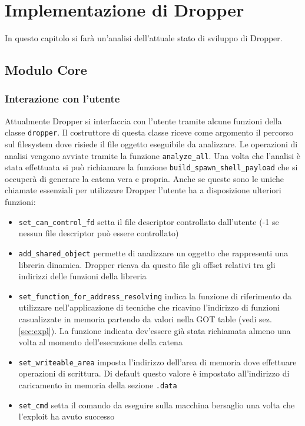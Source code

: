 \chapter{Implementazione di Dropper}
\label{cap:implementazione}

In questo capitolo si farà un'analisi dell'attuale stato di sviluppo
di Dropper.

\section{Modulo Core}

\subsection{Interazione con l'utente}

Attualmente Dropper si interfaccia con l'utente tramite alcune
funzioni della classe \lstinline{dropper}. Il costruttore di questa
classe riceve come argomento il percorso sul filesystem dove risiede
il file oggetto eseguibile da analizzare. Le operazioni di analisi
vengono avviate tramite la funzione \lstinline{analyze_all}. Una volta
che l'analisi è stata effettuata si può richiamare la funzione
\lstinline{build_spawn_shell_payload} che si occuperà di generare la
catena vera e propria. Anche se queste sono le uniche chiamate
essenziali per utilizzare Dropper l'utente ha a disposizione ulteriori
funzioni:
\begin{itemize}

\item \lstinline{set_can_control_fd} setta il file descriptor
  controllato dall'utente (-1 se nessun file descriptor può essere
  controllato)

\item \lstinline{add_shared_object} permette di analizzare un oggetto
  che rappresenti una libreria dinamica. Dropper ricava da questo file
  gli offset relativi tra gli indirizzi delle funzioni della libreria

\item \lstinline{set_function_for_address_resolving} indica la
  funzione di riferimento da utilizzare nell'applicazione di tecniche
  che ricavino l'indirizzo di funzioni casualizzate in memoria
  partendo da valori nella GOT table (vedi sez. \ref{sec:expl}). La
  funzione indicata dev'essere già stata richiamata almeno una volta
  al momento dell'esecuzione della catena

\item \lstinline{set_writeable_area} imposta l'indirizzo dell'area di
  memoria dove effettuare operazioni di scrittura. Di default questo
  valore è impostato all'indirizzo di caricamento in memoria della
  sezione \lstinline{.data}

\item \lstinline{set_cmd} setta il comando da eseguire sulla macchina
  bersaglio una volta che l'exploit ha avuto successo

\end{itemize}

